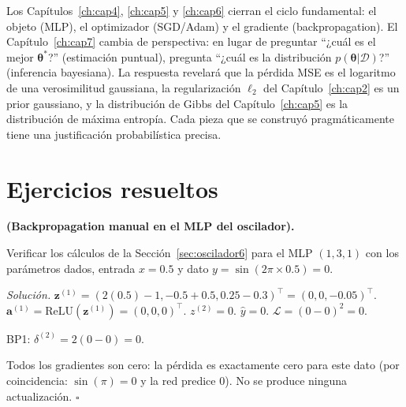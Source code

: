 Los Capítulos~\ref{ch:cap4}, \ref{ch:cap5} y \ref{ch:cap6} cierran el
ciclo fundamental: el objeto (MLP), el optimizador (SGD/Adam) y el
gradiente (backpropagation). El Capítulo~\ref{ch:cap7} cambia de
perspectiva: en lugar de preguntar ``¿cuál es el mejor $\bm{\theta}^*$?''
(estimación puntual), pregunta ``¿cuál es la distribución
$p(\bm{\theta}|\mathcal{D})$?'' (inferencia bayesiana). La respuesta
revelará que la pérdida MSE es el logaritmo de una verosimilitud
gaussiana, la regularización $\ell_2$ del Capítulo~\ref{ch:cap2} es un
prior gaussiano, y la distribución de Gibbs del
Capítulo~\ref{ch:cap5} es la distribución de máxima entropía. Cada pieza
que se construyó pragmáticamente tiene una justificación probabilística
precisa.

\section*{Ejercicios resueltos}

\begin{ejercicio}
\label{ej:bp_manual}
\textbf{(Backpropagation manual en el MLP del oscilador).}

Verificar los cálculos de la Sección~\ref{sec:oscilador6} para el MLP
$(1, 3, 1)$ con los parámetros dados, entrada $x = 0.5$ y dato
$y = \sin(2\pi \times 0.5) = 0$.

\medskip\noindent\textit{Solución.}
$\bm{z}^{(1)} = (2(0.5)-1, -0.5+0.5, 0.25-0.3)^\top = (0, 0, -0.05)^\top$.
$\bm{a}^{(1)} = \text{ReLU}(\bm{z}^{(1)}) = (0, 0, 0)^\top$.
$z^{(2)} = 0$. $\hat{y} = 0$. $\mathcal{L} = (0-0)^2 = 0$.

BP1: $\delta^{(2)} = 2(0-0) = 0$.

Todos los gradientes son cero: la pérdida es exactamente cero para
este dato (por coincidencia: $\sin(\pi) = 0$ y la red predice $0$).
No se produce ninguna actualización. $\square$
\end{ejercicio}

